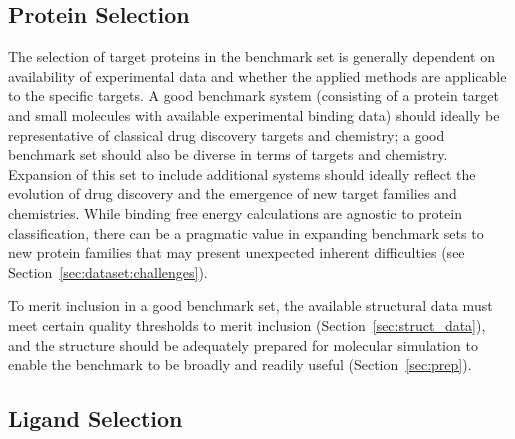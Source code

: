 \documentclass[9pt,bestpractices]{livecoms}
\begin{document}
\subsection{Protein Selection}
\label{sec:dataset:proteins}
The selection of target proteins in the benchmark set is generally dependent
on availability of experimental data and whether the applied methods are applicable to the specific targets.
%
A good benchmark system (consisting of a protein target and small molecules with available experimental binding data) should ideally be representative of classical drug discovery targets and chemistry; a good benchmark set should also be diverse in terms of targets and chemistry. 
Expansion of this set to include additional systems should ideally reflect the evolution of drug discovery and the emergence of new target families and chemistries.
%
While binding free energy calculations are agnostic to protein classification, there can be a pragmatic value in expanding benchmark sets to new protein families that may present unexpected inherent difficulties (see Section~\ref{sec:dataset:challenges}).

To merit inclusion in a good benchmark set, the available structural data must meet certain quality thresholds to merit inclusion (Section~\ref{sec:struct_data}), and the structure should be adequately prepared for molecular simulation to enable the benchmark to be broadly and readily useful (Section~\ref{sec:prep}).

\subsection{Ligand Selection}
\label{sec:dataset:ligands}
\end{document}
